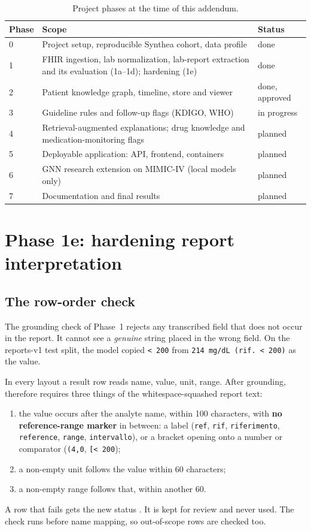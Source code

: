 \documentclass[11pt,a4paper]{article}
\newcommand{\code}[1]{\texttt{\detokenize{#1}}}
\begin{document}
\begin{table}[h]
\centering\small
\begin{tabularx}{\linewidth}{@{}lXl@{}}
\toprule
Phase & Scope & Status \\
\midrule
0 & Project setup, reproducible Synthea cohort, data profile & done \\
1 & FHIR ingestion, lab normalization, lab-report extraction and its evaluation (1a--1d); hardening (1e) & done \\
2 & Patient knowledge graph, timeline, store and viewer & done, approved \\
3 & Guideline rules and follow-up flags (KDIGO, WHO) & in progress \\
4 & Retrieval-augmented explanations; drug knowledge and medication-monitoring flags & planned \\
5 & Deployable application: API, frontend, containers & planned \\
6 & GNN research extension on MIMIC-IV (local models only) & planned \\
7 & Documentation and final results & planned \\
\bottomrule
\end{tabularx}
\caption{Project phases at the time of this addendum.}
\label{tab:phases}
\end{table}

\section{Phase 1e: hardening report interpretation}

\subsection{The row-order check}
\label{sec:order}
The grounding check of Phase~1 rejects any transcribed field that does not occur in the report. It cannot see a \emph{genuine} string placed in the wrong field. On the reports-v1 test split, the model copied \texttt{< 200} from \texttt{214 mg/dL (rif. < 200)} as the value.

In every layout a result row reads name, value, unit, range. After grounding, \code{misplacement} therefore requires three things of the whitespace-squashed report text:
\begin{enumerate}[nosep]
  \item the value occurs after the analyte name, within 100 characters, with \textbf{no reference-range marker} in between: a label (\texttt{ref}, \texttt{rif}, \texttt{riferimento}, \texttt{reference}, \texttt{range}, \texttt{intervallo}), or a bracket opening onto a number or comparator (\texttt{(4,0}, \texttt{[< 200});
  \item a non-empty unit follows the value within 60 characters;
  \item a non-empty range follows that, within another 60.
\end{enumerate}
A row that fails gets the new status \code{misplaced}. It is kept for review and never used. The check runs before name mapping, so out-of-scope rows are checked too.
\end{document}
